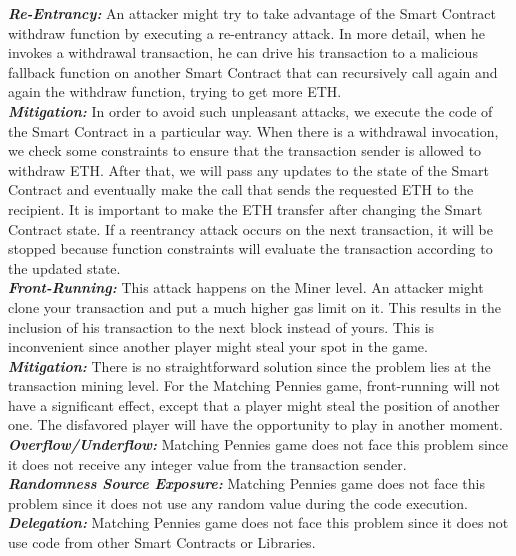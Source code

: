 \documentclass[12pt,a4paper]{article}
\begin{document}
\pagebreak

\textbf{\emph{Re-Entrancy: }}An attacker might try to take advantage of the Smart Contract withdraw function by executing a re-entrancy attack. In more detail, when he invokes a withdrawal transaction, he can drive his transaction to a malicious fallback function on another Smart Contract that can recursively call again and again the withdraw function, trying to get more ETH.\\

\textbf{\emph{Mitigation: }}In order to avoid such unpleasant attacks, we execute the code of the Smart Contract in a particular way. When there is a withdrawal invocation, we check some constraints to ensure that the transaction sender is allowed to withdraw ETH. After that, we will pass any updates to the state of the Smart Contract and eventually make the call that sends the requested ETH to the recipient. It is important to make the ETH transfer after changing the Smart Contract state. If a reentrancy attack occurs on the next transaction, it will be stopped because function constraints will evaluate the transaction according to the updated state.\\

\textbf{\emph{Front-Running: }}This attack happens on the Miner level. An attacker might clone your transaction
and put a much higher gas limit on it. This results in the inclusion of his transaction to the
next block instead of yours. This is inconvenient since another player might steal your spot in the game. \\

\textbf{\emph{Mitigation: }}There is no straightforward solution since the problem lies at the transaction mining level.
For the Matching Pennies game, front-running will not have a significant effect, except that a player
might steal the position of another one. The disfavored player will have the opportunity to play in another moment. \\

\textbf{\emph{Overflow/Underflow: }}Matching Pennies game does not face this problem since it does not receive any integer
value from the transaction sender. \\

\textbf{\emph{Randomness Source Exposure: }}Matching Pennies game does not face this problem since it does not use any
random value during the code execution. \\

\textbf{\emph{Delegation: }}Matching Pennies game does not face this problem since it does not use code
from other Smart Contracts or Libraries. \\
\end{document}

